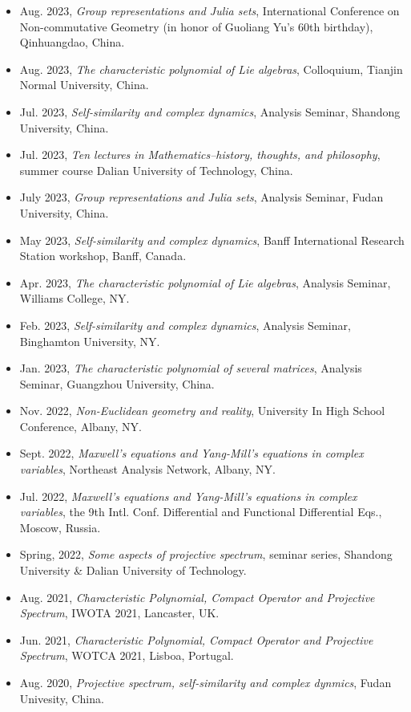 \documentclass[12pt]{res} %
\begin{document}
\begin{resume}
\begin{itemize}
\item Aug. 2023, {\em Group representations and Julia sets}, International Conference on Non-commutative Geometry (in honor of Guoliang Yu's 60th birthday), Qinhuangdao, China.
\item Aug. 2023, {\em The characteristic polynomial of Lie algebras}, Colloquium, Tianjin Normal University, China.
\item Jul. 2023, {\em Self-similarity and complex dynamics}, Analysis Seminar, Shandong University, China.
\item Jul. 2023, {\em Ten lectures in Mathematics--history, thoughts, and philosophy}, summer course Dalian University of Technology, China.
\item July 2023, {\em Group representations and Julia sets}, Analysis Seminar, Fudan University, China.   
\item May 2023, {\em Self-similarity and complex dynamics}, Banff International Research Station workshop, Banff, Canada.   
\item Apr. 2023, {\em The characteristic polynomial of Lie algebras}, Analysis Seminar, Williams College, NY.
\item Feb. 2023, {\em Self-similarity and complex dynamics}, Analysis Seminar, Binghamton University, NY.
\item Jan. 2023, {\em The characteristic polynomial of several matrices}, Analysis Seminar, Guangzhou University, China.
\item Nov. 2022, {\em Non-Euclidean geometry and reality}, University In High School Conference, Albany, NY.
\item Sept. 2022, {\em Maxwell's equations and Yang-Mill's equations in complex variables}, Northeast Analysis Network, Albany, NY.
\item Jul. 2022, {\em Maxwell's equations and Yang-Mill's equations in complex variables}, the 9th Intl. Conf. Differential and Functional Differential Eqs., Moscow, Russia.  
\item Spring, 2022, {\em Some aspects of projective spectrum}, seminar series, Shandong University \& Dalian University of Technology.
\item Aug. 2021, {\em Characteristic Polynomial, Compact Operator and Projective Spectrum}, IWOTA 2021, Lancaster, UK.
\item Jun. 2021, {\em Characteristic Polynomial, Compact Operator and Projective Spectrum}, WOTCA 2021, Lisboa, Portugal.
\item Aug. 2020, {\em Projective spectrum, self-similarity and complex dynmics}, Fudan Univesity, China. 

\end{itemize}
\end{resume}
\end{document}
